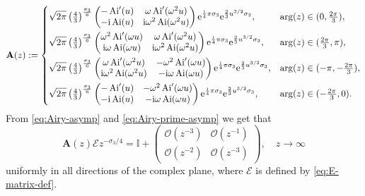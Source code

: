 \documentclass[12pt]{amsart}
\numberwithin{equation}{section}
\newcommand{\ee}{\mathrm{e}}
\newcommand{\ii}{\mathrm{i}}
\newcommand{\bigo}[1]{ \mathcal{O}\! \left( #1 \right) }
\DeclareMathOperator{\Ai}{ {Ai} }
\begin{document}
\begin{equation}
	\mathbf{A}(z) := \begin{dcases}
		\sqrt{2\pi} \left( \tfrac{4}{3} \right)^{\frac{\sigma_3}{6}} 
		\begin{pmatrix} -\Ai'(u) & \omega \Ai'(\omega^2 u) \\ -\ii \Ai(u) &\ii \omega^2 \Ai ( \omega^2 u) \end{pmatrix} 
		\ee^{\frac{\ii}{4} \pi \sigma_3} \ee^{\frac{2}{3}u^{3/2} \sigma_3},
		& \arg(z) \in (0, \tfrac{2\pi}{3}), \\
		\sqrt{2\pi} \left( \tfrac{4}{3} \right)^{\frac{\sigma_3}{6}} 
		\begin{pmatrix} \omega^2 \Ai'(\omega u) & \omega \Ai'(\omega^2 u) \\ \ii \omega \Ai(\omega u) & \ii \omega^2 \Ai ( \omega^2 u) \end{pmatrix} 
		\ee^{\frac{\ii}{4} \pi \sigma_3} \ee^{\frac{2}{3}u^{3/2} \sigma_3},
		& \arg(z) \in (\tfrac{2\pi}{3}, \pi), \\
		\sqrt{2\pi} \left( \tfrac{4}{3} \right)^{\frac{\sigma_3}{6}} 
		\begin{pmatrix} \omega \Ai'(\omega^2 u) & -\omega^2 \Ai'(\omega u) \\ \ii \omega^2 \Ai(\omega^2 u) & -\ii \omega \Ai ( \omega u) \end{pmatrix} 
		\ee^{\frac{\ii}{4} \pi \sigma_3} \ee^{\frac{2}{3}u^{3/2} \sigma_3},
		& \arg(z) \in (-\pi,-\tfrac{2\pi}{3}), \\
		\sqrt{2\pi} \left( \tfrac{4}{3} \right)^{\frac{\sigma_3}{6}} 
		\begin{pmatrix} - \Ai'( u) & -\omega^2 \Ai'(\omega u) \\ -\ii  \Ai( u) & -\ii \omega \Ai ( \omega u) \end{pmatrix} 
		\ee^{\frac{\ii}{4} \pi \sigma_3} \ee^{\frac{2}{3}u^{3/2} \sigma_3},
		& \arg(z) \in (-\tfrac{2\pi}{3} , 0).
	\end{dcases}
\end{equation}
From \eqref{eq:Airy-asymp} and \eqref{eq:Airy-prime-asymp} we get that
\begin{equation}
\mathbf{A}(z) \boldsymbol{\mathcal{E}} z^{-\sigma_3/4}=\mathbb{I}+\begin{pmatrix}\bigo{z^{-3}} & \bigo{z^{-1}}\\\bigo{z^{-2}} & \bigo{z^{-3}}\end{pmatrix},\quad z\to\infty
\label{eq:Airy-parametrix-norm}
\end{equation}
uniformly in all directions of the complex plane, where $\boldsymbol{\mathcal{E}}$ is defined by \eqref{eq:E-matrix-def}.
\end{document}
